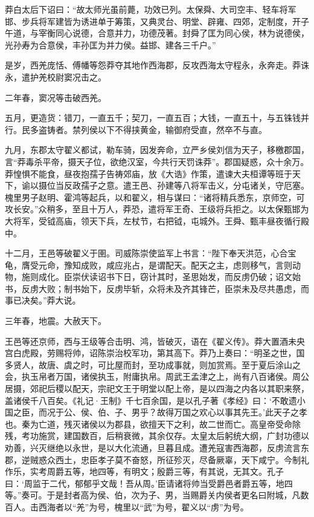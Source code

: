 \documentclass[12pt,UTF8]{ctexbook}
\begin{document}
莽白太后下诏曰：“故太师光虽前薨，功效已列。太保舜、大司空丰、轻车将军邯、步兵将军建皆为诱进单于筹策，又典灵台、明堂、辟雍、四郊，定制度，开子午道，与宰衡同心说德，合意并力，功德茂著。封舜了匡为同心侯，林为说德侯，光孙寿为合意侯，丰孙匡为并力侯。益邯、建各三千户。”



是岁，西羌庞恬、傅幡等怨莽夺其地作西海郡，反攻西海太守程永，永奔走。莽诛永，遣护羌校尉窦况击之。



二年春，窦况等击破西羌。



五月，更造货：错刀，一直五千；契刀，一直五百；大钱，一直五十，与五铢钱并行。民多盗铸者。禁列侯以下不得挟黄金，输御府受直，然卒不与直。



九月，东郡太守翟义都试，勒车骑，因发奔命，立严乡侯刘信为天子，移檄郡国，言“莽毒杀平帝，摄天子位，欲绝汉室，今共行天罚诛莽”。郡国疑惑，众十余万。莽惶惧不能食，昼夜抱孺子告祷郊庙，放《大诰》作策，遣谏大夫桓谭等班于天下，谕以摄位当反政孺子之意。遣王邑、孙建等八将军击义，分屯诸关，守厄塞。槐里男子赵明、霍鸿等起兵，以和翟义，相与谋曰：“诸将精兵悉东，京师空，可攻长安。”众稍多，至且十万人，莽恐，遣将军王奇、王级将兵拒之。以太保甄邯为大将军，受钺高庙，领天下兵，左杖节，右把钺，屯城外。王舜、甄丰昼夜循行殿中。



十二月，王邑等破翟义于圉。司威陈崇使监军上书言：“陛下奉天洪范，心合宝龟，膺受元命，豫知成败，咸应兆占，是谓配天。配天之主，虑则移气，言则动物，施则成化。臣崇伏读诏书下日，窃计其时，圣思始发，而反虏仍破；诏文始书，反虏大败；制书始下，反虏毕斩，众将未及齐其锋芒，臣崇未及尽共愚虑，而事已决矣。”莽大说。



三年春，地震。大赦天下。



王邑等还京师，西与王级等合击明、鸿，皆破灭，语在《翟义传》。莽大置酒未央宫白虎殿，劳赐将帅，诏陈崇治校军功，第其高下。莽乃上奏曰：“明圣之世，国多贤人，故唐、虞之时，可比屋而封，至功成事就，则加赏焉。至于夏后涂山之会，执玉帛者万国，诸侯执玉，附庸执帛。周武王孟津之上，尚有八百诸侯。周公居摄，郊祀后稷以配天，宗祀文王于明堂以配上帝，是以四海之内各以其职来祭，盖诸侯千八百矣。《礼记·王制》千七百余国，是以孔子著《孝经》曰：‘不敢遗小国之臣，而况于公、侯、伯、子、男乎？故得万国之欢心以事其先王。’此天子之孝也。秦为亡道，残灭诸侯以为郡县，欲擅天下之利，故二世而亡。高皇帝受命除残，考功施赏，建国数百，后稍衰微，其余仅存。太皇太后躬统大纲，广封功德以劝善，兴灭继绝以永世，是以大化流通，旦暮且成。遭羌寇害西海郡，反虏流言东郡，逆贼惑众西土，忠臣孝子莫不奋怒，所征殄灭，尽备厥辜，天下咸宁。今制礼作乐，实考周爵五等，地四等，有明文；殷爵三等，有其说，无其文。孔子曰：‘周监于二代，郁郁乎文哉！吾从周。’臣请诸将帅当受爵邑者爵五等，地四等。”奏可。于是封者高为侯、伯，次为子、男，当赐爵关内侯者更名曰附城，凡数百人。击西海者以“羌”为号，槐里以“武”为号，翟义以“虏”为号。
\end{document}
